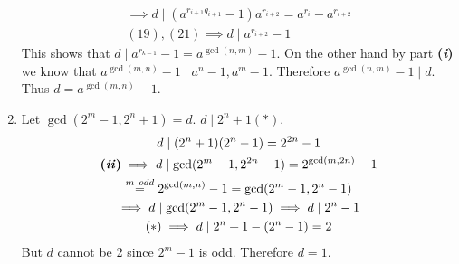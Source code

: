 \begin{enumerate}[label=\textbf{(\textit{\roman*})}]
\begin{gather}
            \implies d \mid (a^{r_{i + 1}q_{i + 1}} - 1) a^{r_{i + 2}} = a^{r_i} - a^{r_{i + 2}} \\
            (19), (21) \implies d \mid a^{r_{i+ 2}} - 1
        \end{gather}
        This shows that $d \mid a^{r_{k - 1}} - 1 = a^{\gcd(n, m)} - 1$. On the other hand by part \textbf{(\textit{i})} we know that $a^{\gcd(m,n)} - 1 \mid a^n - 1, a^m - 1$. Therefore $a^{\gcd(n,m)} - 1 \mid d$. Thus $d = a^{\gcd(m, n)} - 1$.
    \item 
        Let $\gcd(2^m - 1, 2^n + 1) =d $. $d \mid 2^n + 1(*)$.
        \begin{gather*}
            d \mid (2^n + 1)(2^n - 1) = 2^{2n} - 1 \\
            \textbf{(\textit{ii})} \implies d \mid \gcd(2^m - 1, 2^{2n} - 1) = 2^{\gcd(m, 2n)} - 1 \\ 
            \overset{m\  odd}{=} 2^{\gcd(m, n)} - 1 = \gcd(2^m - 1, 2^n - 1) \\
            \implies d \mid \gcd(2^m - 1, 2^n - 1) \implies d \mid 2^n - 1 \\
            (*) \implies d \mid 2^n + 1 - (2^n - 1) = 2 
        \end{gather*}
        But $d$ cannot be 2 since $2^m - 1 $ is odd. Therefore $d = 1$.
\end{enumerate}